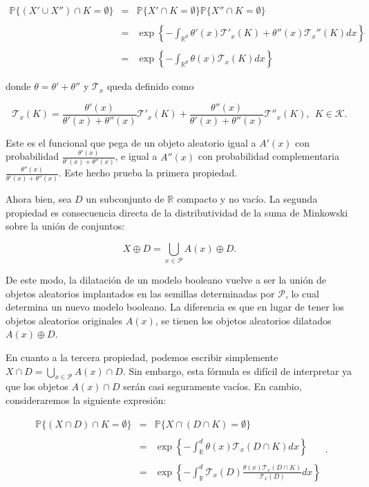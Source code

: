 \[\begin{array}{ccl}
\mathbb{P}\{(X'\cup X'')\cap K=\emptyset\}&=&\mathbb{P}\{X'\cap K=\emptyset\}\mathbb{P}\{X''\cap K=\emptyset\}\\
&&\\
&=&\exp\left\{-\int_{\mathbb{R}^d}\theta'(x)\mathcal{T}'_x(K)+\theta''(x)\mathcal{T}_x''(K)dx\right\}\\
&&\\
&=&\exp\left\{-\int_{\mathbb{R} ^d}\theta(x)\mathcal{T}_x(K)dx\right\}
\end{array}\]

donde $\theta=\theta'+\theta''$ y $\mathcal{T}_x$ queda definido como

\[\mathcal{T}_x(K)=\frac{\theta'(x)}{\theta'(x)+\theta''(x)}\mathcal{T}'_x(K)+\frac{\theta''(x)}{\theta'(x)+\theta''(x)}\mathcal{T}''_x(K),\ \ K\in\mathcal{K}.\]

Este es el funcional que pega de un objeto aleatorio igual a $A'(x)$ con probabilidad $\frac{\theta'(x)}{\theta'(x)+\theta''(x)}$, e igual a $A''(x)$ con probabilidad complementaria $\frac{\theta''(x)}{\theta'(x)+\theta''(x)}$. Este hecho prueba la primera propiedad.

Ahora bien, sea $D$ un subconjunto de $\mathbb{R}$ compacto y no vac\'io. La segunda propiedad es consecuencia directa de la distributividad de la suma de Minkowski sobre la uni\'on de conjuntos:

\[X\oplus D=\bigcup_{x\in\mathcal{P}}A(x)\oplus D.\]

De este modo, la dilataci\'on de un modelo booleano vuelve a ser la uni\'on de objetos aleatorios implantados en las semillas determinadas por $\mathcal{P}$, lo cual determina un nuevo modelo booleano. La diferencia es que en lugar de tener los objetos aleatorios originales $A(x)$, se tienen los objetos aleatorios dilatados $A(x)\oplus D$.

En cuanto a la tercera propiedad, podemos escribir simplemente $X\cap D=\bigcup_{x\in\mathcal{P}}A(x)\cap D$. Sin embargo, esta f\'ormula es dif\'icil de interpretar ya que los objetos $A(x)\cap D$ ser\'an casi seguramente vac\'ios. En cambio, consideraremos la siguiente expresi\'on:

\[\begin{array}{ccl}
\mathbb{P}\{(X\cap D)\cap K=\emptyset\}&=&\mathbb{P}\{X\cap (D\cap K)=\emptyset\}\\
&&\\
&=&\exp\left\{-\int_\mathbb{R}^d\theta(x)\mathcal{T}_x(D\cap K)dx\right\}\\
&&\\
&=&\exp\left\{-\int_\mathbb{R}^d\mathcal{T}_x(D)\frac{\theta(x)\mathcal{T}_x(D\cap K)}{\mathcal{T}_x(D)}dx\right\}
\end{array}
.\]

